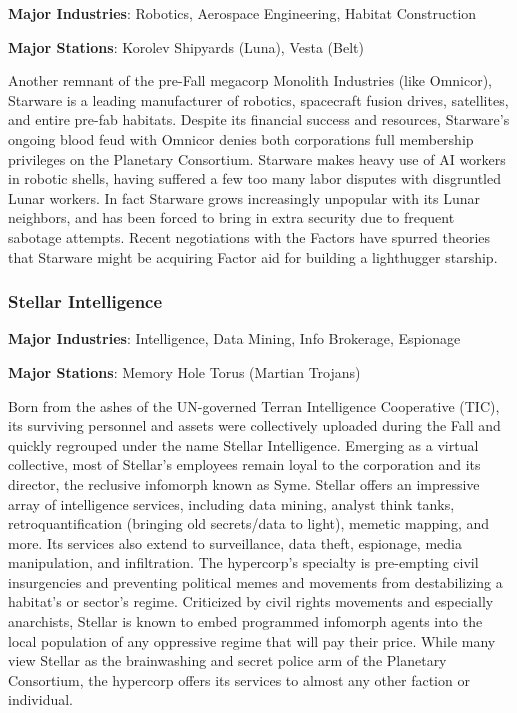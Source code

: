 \textbf{Major Industries}: Robotics, Aerospace Engineering, Habitat Construction

\textbf{Major Stations}: Korolev Shipyards (Luna), Vesta (Belt)


Another remnant of the pre-Fall megacorp Monolith Industries (like
Omnicor), Starware is a leading manufacturer of robotics, spacecraft
fusion drives, satellites, and entire pre-fab habitats. Despite its
financial success and resources, Starware's ongoing blood feud with
Omnicor denies both corporations full membership privileges on the
Planetary Consortium. Starware makes heavy use of AI workers in
robotic shells, having suffered a few too many labor disputes with
disgruntled Lunar workers. In fact Starware grows increasingly
unpopular with its Lunar neighbors, and has been forced to bring in
extra security due to frequent sabotage attempts. Recent negotiations
with the Factors have spurred theories that Starware might be
acquiring Factor aid for building a lighthugger starship.

\subsubsection{Stellar Intelligence}
\label{sec:stellar-intelligence}

\textbf{Major Industries}: Intelligence, Data Mining, Info Brokerage, Espionage

\textbf{Major Stations}: Memory Hole Torus (Martian Trojans)


Born from the ashes of the UN-governed Terran Intelligence Cooperative
(TIC), its surviving personnel and assets were collectively uploaded
during the Fall and quickly regrouped under the name Stellar
Intelligence.  Emerging as a virtual collective, most of Stellar's
employees remain loyal to the corporation and its director, the
reclusive infomorph known as Syme. Stellar offers an impressive array
of intelligence services, including data mining, analyst think tanks,
retroquantification (bringing old secrets/data to light), memetic
mapping, and more. Its services also extend to surveillance, data
theft, espionage, media manipulation, and infiltration. The
hypercorp's specialty is pre-empting civil insurgencies and preventing
political memes and movements from destabilizing a habitat's or
sector's regime. Criticized by civil rights movements and especially
anarchists, Stellar is known to embed programmed infomorph agents into
the local population of any oppressive regime that will pay their
price. While many view Stellar as the brainwashing and secret police
arm of the Planetary Consortium, the hypercorp offers its services to
almost any other faction or individual.

